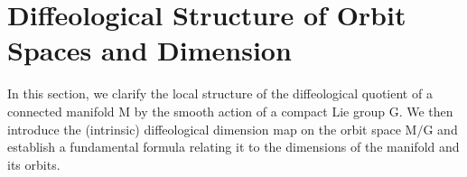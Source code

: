 \documentclass[10pt,reqno,letterpaper,twoside]{amsart}
\theoremstyle{article}
\def \G{\mathrm G}
\def \M{\mathrm M}
\begin{document}
  \section{Diffeological Structure of Orbit Spaces and Dimension}
  \label{sec:Structure_of_Orbit_Spaces}
  
  In this section,
  we clarify the local structure of the diffeological quotient of a connected manifold $\M$ by the smooth action of a compact Lie group $\G$.
  We then introduce the (intrinsic) diffeological dimension map on the orbit space $\M/\G$ and establish a fundamental formula relating it to the dimensions of the manifold and its orbits.
  
  
\end{document}
